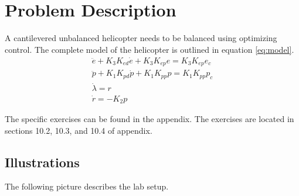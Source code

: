 \section{Problem Description}\label{sec:prob_descr}
A cantilevered unbalanced helicopter needs to be balanced using optimizing control.
The complete model of the helicopter is outlined in equation \ref{eq:model}.
\begin{subequations}\label{eq:model}
	\begin{align}
		\ddot{e} + K_{3} K_{ed} \dot{e} + K_{3} K_{ep} e = K_{3} K_{ep} e_{c} \label{eq:model_se_elev} \\
		\ddot{p} + K_{1} K_{pd} \dot{p} + K_{1} K_{pp} p = K_{1} K_{pp} p_{c} \label{eq:model_se_pitch} \\
		\dot{\lambda} = r \label{eq:model_se_lambda} \\
		\dot{r} = -K_{2} p \label{eq:model_se_r}
	\end{align}
\end{subequations}

The specific exercises can be found in the appendix. The exercises are located in sections 10.2, 10.3, and 10.4 of appendix.

\subsection{Illustrations}
The following picture describes the lab setup.

